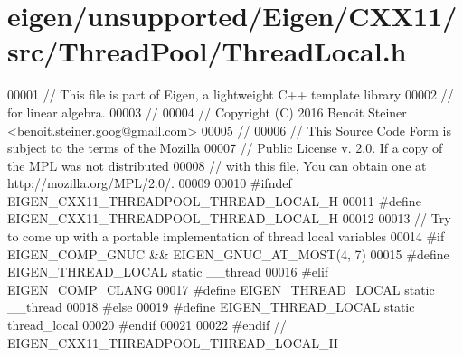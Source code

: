\hypertarget{eigen_2unsupported_2_eigen_2_c_x_x11_2src_2_thread_pool_2_thread_local_8h_source}{}\section{eigen/unsupported/\+Eigen/\+C\+X\+X11/src/\+Thread\+Pool/\+Thread\+Local.h}
\label{eigen_2unsupported_2_eigen_2_c_x_x11_2src_2_thread_pool_2_thread_local_8h_source}

\begin{DoxyCode}
00001 \textcolor{comment}{// This file is part of Eigen, a lightweight C++ template library}
00002 \textcolor{comment}{// for linear algebra.}
00003 \textcolor{comment}{//}
00004 \textcolor{comment}{// Copyright (C) 2016 Benoit Steiner <benoit.steiner.goog@gmail.com>}
00005 \textcolor{comment}{//}
00006 \textcolor{comment}{// This Source Code Form is subject to the terms of the Mozilla}
00007 \textcolor{comment}{// Public License v. 2.0. If a copy of the MPL was not distributed}
00008 \textcolor{comment}{// with this file, You can obtain one at http://mozilla.org/MPL/2.0/.}
00009 
00010 \textcolor{preprocessor}{#ifndef EIGEN\_CXX11\_THREADPOOL\_THREAD\_LOCAL\_H}
00011 \textcolor{preprocessor}{#define EIGEN\_CXX11\_THREADPOOL\_THREAD\_LOCAL\_H}
00012 
00013 \textcolor{comment}{// Try to come up with a portable implementation of thread local variables}
00014 \textcolor{preprocessor}{#if EIGEN\_COMP\_GNUC && EIGEN\_GNUC\_AT\_MOST(4, 7)}
00015 \textcolor{preprocessor}{#define EIGEN\_THREAD\_LOCAL static \_\_thread}
00016 \textcolor{preprocessor}{#elif EIGEN\_COMP\_CLANG}
00017 \textcolor{preprocessor}{#define EIGEN\_THREAD\_LOCAL static \_\_thread}
00018 \textcolor{preprocessor}{#else}
00019 \textcolor{preprocessor}{#define EIGEN\_THREAD\_LOCAL static thread\_local}
00020 \textcolor{preprocessor}{#endif}
00021 
00022 \textcolor{preprocessor}{#endif  // EIGEN\_CXX11\_THREADPOOL\_THREAD\_LOCAL\_H}
\end{DoxyCode}
